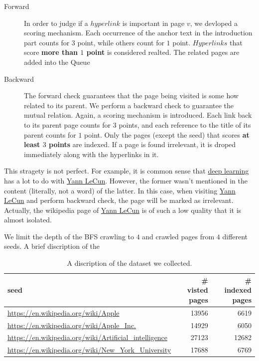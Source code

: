 \documentclass[12pt]{amsart}
\newcommand{\0}{\mat{0}}
\newcommand{\1}{\mathds{1}}
\begin{document}
\begin{description}
\item[Forward] In order to judge if a $hyperlink$ is important in page $v$, we devloped a scoring mechanism. Each occurrence of the anchor text in the introduction part counts for $3$ point, while others count for $1$ point. $Hyperlinks$ that score \textbf{more than $1$ point} is considered realted. The related pages are added into the Queue
\item[Backward] The forward check guarantees that the page being visited is some how related to its parent. We perform a backward check to guarantee the mutual relation. Again, a scoring mechanism is introduced. Each link back to its parent page counts for $3$ points, and each reference to the title of its parent counts for $1$ point. Only the pages (except the seed) that scores \textbf{at least $3$ points} are indexed. If a page is found irrelevant, it is droped immediately along with the hyperlinks in it. 
\end{description}

This stragety is not perfect. For example, it is common sense that \href{https://en.wikipedia.org/wiki/Deep\_learning}{deep learning} has a lot to do with \href{https://en.wikipedia.org/wiki/Yann\_LeCun}{Yann LeCun}. However, the former wasn't mentioned in the content (literally, not a word) of the latter. In this case, when visiting \href{https://en.wikipedia.org/wiki/Yann\_LeCun}{Yann LeCun} and perform backward check, the page will be marked as irrelevant. Actually, the wikipedia page of  \href{https://en.wikipedia.org/wiki/Yann\_LeCun}{Yann LeCun} is of such a low quality that it is almost isolated. 

We limit the depth of the BFS crawling to $4$ and crawled pages from $4$ different seeds. A brief discription of the 

\begin{table}[htb]
\centering
\begin{tabular}{|l|r|r|}\hline
seed & \# visted pages & \# indexed pages \\ \hline
\href{https://en.wikipedia.org/wiki/Apple}{\textsf{https://en.wikipedia.org/wiki/Apple}} & 13956 & 6619 \\ \hline
\href{https://en.wikipedia.org/wiki/Apple\_Inc.}{\textsf{https://en.wikipedia.org/wiki/Apple\_Inc.}} & 14929 & 6050 \\ \hline
\href{https://en.wikipedia.org/wiki/Artificial\_intelligence}{\textsf{https://en.wikipedia.org/wiki/Artificial\_intelligence}} & 27123 & 12682 \\ \hline
\href{https://en.wikipedia.org/wiki/New\_York\_University}{\textsf{https://en.wikipedia.org/wiki/New\_York\_University}} & 17688 & 6769 \\ \hline 
\end{tabular}
\caption{A discription of the dataset we collected. }
\label{tbl:dataset}
\end{table}
\end{document}
